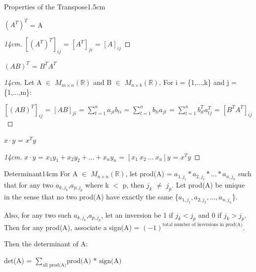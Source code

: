     \begin{ltheorem}{Properties of the Transpose}{1.5cm}
        \item $(A^T)^T$ = A
        
            \begin{proof}[14cm]
                $[(A^T)^T]_{ij}$
                = $[A^T]_{ji}$
                = $[A]_{ij}$
            \end{proof}
        
        \item $(AB)^T$ = $B^T A^T$
        
            \begin{proof}[14cm]
                Let A $\in$ $M_{m \times n}(\mathbb{R})$ and
                B $\in$ $M_{n \times k}(\mathbb{R})$.
                For i = \{1,...,k\} and j = \{1,...,m\}:

                \hspace{0.5cm}
                $[(AB)^T]_{ij}$
                = $[AB]_{ji}$
                = $\sum_{t=1}^n a_{jt}b_{ti}$
                = $\sum_{t=1}^n b_{ti}a_{jt}$
                = $\sum_{t=1}^n b^T_{it}a^T_{tj}$
                = $[B^T A^T]_{ij}$
            \end{proof}

        \item $x \cdot y$ = $x^T y$
        
            \begin{proof}[14cm]
                $x \cdot y$
                = $x_1y_1 + x_2y_2 + ... + x_ny_n$
                = $[x_1 \ x_2 \ ... \ x_n]y$
                = $x^Ty$
            \end{proof}
    \end{ltheorem}

    \vspace{0.5cm}



    \begin{definition}{Determinant}{14cm}
        For A $\in$ $M_{n \times n}(\mathbb{R})$,
        let prod(A) = $a_{1,j_1} * a_{2,j_2} * ... * a_{n,j_n}$
        such that for any two $a_{k,j_k}$,$a_{p,j_p}$ where k $<$ p,
        then $j_k$ $\not =$ $j_p$.
        Let prod(A) be unique in the sense that no two prod(A)
        have exactly the same \{$a_{1,j_1}, a_{2,j_2}, ... , a_{n,j_n}$\}.

        Also, for any two such $a_{k,j_k}$,$a_{p,j_p}$,
        let an inversion be 1 if $j_k < j_p$ and 0 if $j_k > j_p$.
        Then for any prod(A), associate a sign(A)
        = $(-1)^{\text{total number of inversions in prod(A)}}$.

        Then the {\color{lblue} determinant} of A:

        \hspace{0.5cm}
        det(A) = $\sum_{\text{all prod(A)}} \text{prod(A) * sign(A)}$
    \end{definition}

